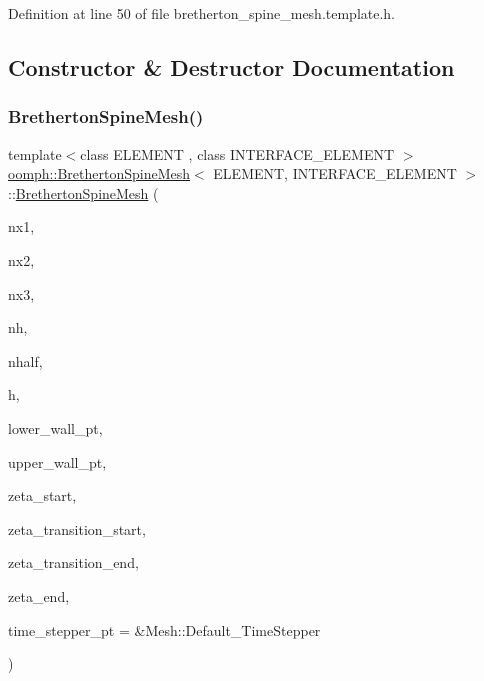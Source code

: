Definition at line 50 of file bretherton\+\_\+spine\+\_\+mesh.\+template.\+h.



\subsection{Constructor \& Destructor Documentation}
\mbox{\label{classoomph_1_1BrethertonSpineMesh_a0e9c404141ee65b000ab4d1fdc4f11da}} 
\subsubsection{\texorpdfstring{Bretherton\+Spine\+Mesh()}{BrethertonSpineMesh()}}
{\footnotesize\ttfamily template$<$class E\+L\+E\+M\+E\+NT , class I\+N\+T\+E\+R\+F\+A\+C\+E\+\_\+\+E\+L\+E\+M\+E\+NT $>$ \\
\hyperlink{classoomph_1_1BrethertonSpineMesh}{oomph\+::\+Bretherton\+Spine\+Mesh}$<$ E\+L\+E\+M\+E\+NT, I\+N\+T\+E\+R\+F\+A\+C\+E\+\_\+\+E\+L\+E\+M\+E\+NT $>$\+::\hyperlink{classoomph_1_1BrethertonSpineMesh}{Bretherton\+Spine\+Mesh} (\begin{DoxyParamCaption}\item[{const unsigned \&}]{nx1,  }\item[{const unsigned \&}]{nx2,  }\item[{const unsigned \&}]{nx3,  }\item[{const unsigned \&}]{nh,  }\item[{const unsigned \&}]{nhalf,  }\item[{const double \&}]{h,  }\item[{Geom\+Object $\ast$}]{lower\+\_\+wall\+\_\+pt,  }\item[{Geom\+Object $\ast$}]{upper\+\_\+wall\+\_\+pt,  }\item[{const double \&}]{zeta\+\_\+start,  }\item[{const double \&}]{zeta\+\_\+transition\+\_\+start,  }\item[{const double \&}]{zeta\+\_\+transition\+\_\+end,  }\item[{const double \&}]{zeta\+\_\+end,  }\item[{Time\+Stepper $\ast$}]{time\+\_\+stepper\+\_\+pt = {\ttfamily \&Mesh\+:\+:Default\+\_\+TimeStepper} }\end{DoxyParamCaption})}



